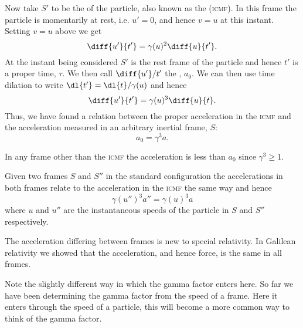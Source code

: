 \documentclass[fleqn]{NotesClass}
\newcommand{\ICMF}{\textsc{icmf}}
\begin{document}
    Now take \(S'\) to be the  of the particle, also known as the  (\ICMF).
    In this frame the particle is momentarily at rest, i.e. \(u' = 0\), and hence \(v = u\) at this instant.
    Setting \(v = u\) above we get
    \begin{equation}
        \diff{u'}{t'} = \gamma(u)^2 \diff{u}{t'}.
    \end{equation}
    At the instant being considered \(S'\) is the rest frame of the particle and hence \(t'\) is a proper time, \(\tau\).
    We then call \(\diff{u'}/{t'}\) the , \(a_0\).
    We can then use time dilation to write \(\dl{t'} = \dl{t}/\gamma(u)\) and hence
    \begin{equation}
        \diff{u'}{t'} = \gamma(u)^3\diff{u}{t}.
    \end{equation}
    Thus, we have found a relation between the proper acceleration in the \ICMF{} and the acceleration measured in an arbitrary inertial frame, \(S\):
    \begin{equation}
        a_0 = \gamma^3 a.
    \end{equation}
    
    In any frame other than the \ICMF{} the acceleration is less than \(a_0\) since \(\gamma^3 \ge 1\).
    
    Given two frames \(S\) and \(S''\) in the standard configuration the accelerations in both frames relate to the acceleration in the \ICMF{} the same way and hence
    \begin{equation}
        \gamma(u'')^3a'' = \gamma(u)^3a
    \end{equation}
    where \(u\) and \(u''\) are the instantaneous speeds of the particle in \(S\) and \(S''\) respectively.
    
    The acceleration differing between frames is new to special relativity.
    In Galilean relativity we showed that the acceleration, and hence force, is the same in all frames.
    
    Note the slightly different way in which the gamma factor enters here.
    So far we have been determining the gamma factor from the speed of a frame.
    Here it enters through the speed of a particle, this will become a more common way to think of the gamma factor.
    
\end{document}

